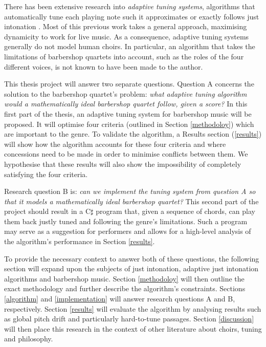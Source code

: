 \documentclass[a4paper]{article}
\begin{document}
There has been extensive research into \textit{adaptive tuning systems}, algorithms that automatically tune each playing note such it approximates or exactly follows just intonation \cite{sethares_adaptive_2005}. Most of this previous work takes a general approach, maximising dynamicity to work for live music. As a consequence, adaptive tuning systems generally do not model human choirs. In particular, an algorithm that takes the limitations of barbershop quartets into account, such as the roles of the four different voices, is not known to have been made to the author.

This thesis project will answer two separate questions. Question A concerns the solution to the barbershop quartet's problem: {\it what adaptive tuning algorithm would a mathematically ideal barbershop quartet follow, given a score?} In this first part of the thesis, an adaptive tuning system for barbershop music will be proposed. It will optimise four criteria (outlined in Section \ref{methodoloy}) which are important to the genre. To validate the algorithm, a Results section (\ref{results}) will show how the algorithm accounts for these four criteria and where concessions need to be made in order to minimise conflicts between them. We hypothesise that these results will also show the impossibility of completely satisfying the four criteria.

Research question B is: {\it can we implement the tuning system from question A so that it models a mathematically ideal barbershop quartet?} This second part of the project should result in a C$\sharp$ program that, given a sequence of chords, can play them back justly tuned and following the genre's limitations. Such a program may serve as a suggestion for performers and allows for a high-level analysis of the algorithm's performance in Section \ref{results}.

To provide the necessary context to answer both of these questions, the following section will expand upon the subjects of just intonation, adaptive just intonation algorithms and barbershop music. Section \ref{methodoloy} will then outline the exact methodology and further describe the algorithm's constraints. Sections \ref{algorithm} and \ref{implementation} will answer research questions A and B, respectively. Section \ref{results} will evaluate the algorithm by analysing results such as global pitch drift and particularly hard-to-tune passages. Section \ref{discussion} will then place this research in the context of other literature about choirs, tuning and philosophy.
\end{document}
